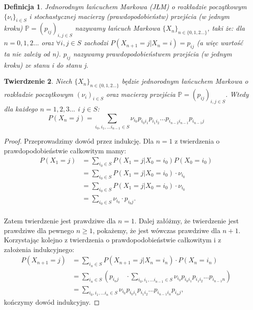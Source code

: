 \documentclass[a4paper]{article}
\theoremstyle{defn}
\newtheorem{defn}{Definicja}[subsection]
\theoremstyle{theorem}
\newtheorem{theorem}[defn]{Twierdzenie}
\theoremstyle{lemma}
\theoremstyle{cor}
\theoremstyle{fact}
\begin{document}
\begin{defn}\label{defn2.1.9}
\textit{Jednorodnym łańcuchem Markowa} (JŁM) o rozkładzie początkowym $\{\nu_i\}_{i \in S}$ i stochastycznej \textit{macierzy (prawdopodobieństw) przejścia (w jednym kroku)} $\mathbb{P} = (p_{ij})_{i, j \in S}$ nazywamy łańcuch Markowa $\{X_n\}_{n \in \{0,1,2...\}}$, taki że: dla $n = 0,1,2...$ oraz $\forall i,j \in S$ zachodzi $P(X_{n+1} = j|X_n = i) = p_{ij}$ (a więc wartość ta nie zależy od \textit{n}). $p_{ij}$ nazywamy \textit{prawdopodobieństwem przejścia (w jednym kroku)} ze stanu \textit{i} do stanu \textit{j}.
\end{defn}
\begin{theorem}\label{theorem2.1.10}
Niech $\{X_n\}_{n \in \{0,1,2...\}}$ będzie jednorodnym łańcuchem Markowa o rozkładzie początkowym $(\nu_i)_{i \in S}$ oraz macierzy przejścia $\mathbb{P} = (p_{ij})_{i,j \in S}$. Wtedy dla każdego $n = 1,2,3...$ i $j \in S$:\\
$$P(X_n = j) = \sum\limits_{i_0, i_1,... i_{n-1} \in S} \nu_{i_0} p_{i_{0}i_{1}} p_{i_{1}i_{2}} ... p_{i_{n-2}i_{n-1}}p_{i_{n-1}j}$$
\end{theorem}
\begin{proof}Przeprowadzimy dowód przez indukcję. Dla $n=1$ z twierdzenia o prawdopodobieństwie całkowitym mamy:
\begin{align*}
P(X_1 = j) &= \sum\limits_{i_0 \in S} P(X_1 = j | X_0 = i_0)P(X_0 = i_0)\\
&= \sum\limits_{i_0 \in S} P(X_1 = j | X_0 = i_0) \cdot \nu_{i_0} \\
&= \sum\limits_{i_0 \in S} P(X_1 = j | X_0 = i_0) \cdot \nu_{i_0} \\
&= \sum\limits_{i_0 \in S}  \nu_{i_0} \cdot p_{i_0j}.
\end{align*}
\\Zatem twierdzenie jest prawdziwe dla $n=1$. Dalej załóżmy, że twierdzenie jest prawdziwe dla pewnego $n \geq 1$, pokażemy, że jest wówczas prawdziwe dla $n+1$. Korzystając kolejno z twierdzenia o prawdopodobieństwie całkowitym i z założenia indukcyjnego:
\begin{align*}P(X_{n+1} = j) &= \sum\limits_{i_{n} \in S} P(X_{n+1} = j|X_n = i_n)\cdot P(X_n = i_n) \\
&= \sum\limits_{i_n \in S}\left(p_{i_nj} \quad \cdot \sum\limits_{i_0, i_1, ... i_{n-1} \in S} \nu_{i_0} p_{i_{0}i_{1}} p_{i_{1}i_{2}} ... p_{i_{n-1}n}\right) \\
&= \sum\limits_{i_0, i_1,... i_n \in S} \nu_{i_0} p_{i_{0}i_{1}} p_{i_{1}i_{2}} ... p_{i_{n-1}i_n}p_{i_{n}j},
\end{align*}
kończymy dowód indukcyjny.
\end{proof}
\end{document}
